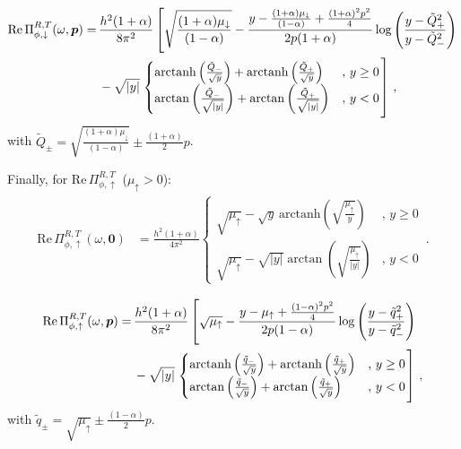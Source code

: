 \begin{align}
	\text{Re}\, \Pi^{R,T}_{\phi,\downarrow}(\omega,\bm{p}) =\,
	&\frac{h^2(1+\alpha)}{8\pi^2} \left[
	\sqrt{\frac{(1+\alpha)\mu_{\downarrow}}{(1-\alpha)}} - \frac{y-\frac{(1+\alpha)\mu_{\downarrow}}{(1-\alpha)}+\frac{(1+\alpha)^2p^2}{4}}{2p(1+\alpha)}\log\left(\frac{y-\tilde{Q}^2_{+}}{y-\tilde{Q}^2_{-}}\right)\right. \notag \\
	&- \sqrt{|y|}\left.
	\begin{cases}
		\text{arctanh}\left(\frac{\tilde{Q}_{-}}{\sqrt{y}}\right) + 
		\text{arctanh}\left(\frac{\tilde{Q}_{+}}{\sqrt{y}}\right) & ,\, y \geq 0 \\
		\text{arctan}\left(\frac{\tilde{Q}_{-}}{\sqrt{|y|}}\right) + 
		\text{arctan}\left(\frac{\tilde{Q}_{+}}{\sqrt{|y|}}\right) & ,\, y < 0
	\end{cases}
	\right] \,,
\end{align}
with $\tilde{Q}_{\pm} = \sqrt{\frac{(1+\alpha)\mu_{\downarrow}}{(1-\alpha)}} \pm \frac{(1+\alpha)}{2}p$.

Finally, for $\text{Re}\,\Pi^{R,T}_{\phi,\uparrow}$ ($\mu_{\uparrow} > 0$):
\begin{align}
	\text{Re}\, \Pi^{R,T}_{\phi,\uparrow}(\omega,\bm{0}) &= \frac{h^2(1+\alpha)}{4\pi^2} 
	\begin{cases}
		\sqrt{\mu_{\uparrow}}-\sqrt{y}\,
		\text{arctanh}\left(\sqrt{\frac{\mu_{\uparrow}}{y}}\right) & ,\, y \geq 0 \\
		\sqrt{\mu_{\uparrow}} - \sqrt{|y|} \arctan\left( \sqrt{\frac{\mu_{\uparrow}}{|y|}}\right) & ,\, y < 0
	\end{cases}	\,.
\end{align}

\begin{align}
	\text{Re}\, \Pi^{R,T}_{\phi,\uparrow}(\omega,\bm{p}) =\,
	&\frac{h^2(1+\alpha)}{8\pi^2} \left[
	\sqrt{\mu_{\uparrow}} - \frac{y-\mu_{\uparrow}+\frac{(1-\alpha)^2p^2}{4}}{2p(1-\alpha)}\log\left(\frac{y-\tilde{q}^2_{+}}{y-\tilde{q}^2_{-}}\right)\right. \notag \\
	&- \sqrt{|y|}\left.
	\begin{cases}
		\text{arctanh}\left(\frac{\tilde{q}_{-}}{\sqrt{y}}\right) + 
		\text{arctanh}\left(\frac{\tilde{q}_{+}}{\sqrt{y}}\right) & ,\, y \geq 0 \\
		\text{arctan}\left(\frac{\tilde{q}_{-}}{\sqrt{y}}\right) + 
		\text{arctan}\left(\frac{\tilde{q}_{+}}{\sqrt{y}}\right) & ,\, y < 0
	\end{cases}
	\right] \,,
\end{align}
with $\tilde{q}_{\pm} = \sqrt{\mu_{\uparrow}} \pm \frac{(1-\alpha)}{2}p$. \\

